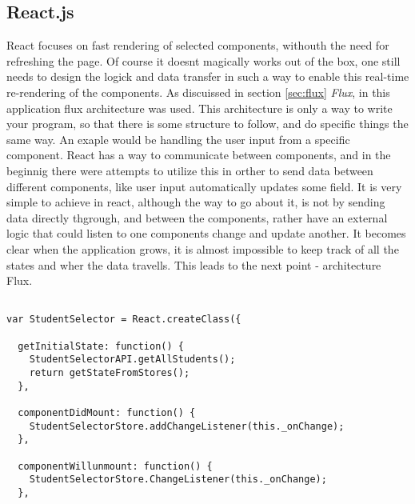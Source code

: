 \subsection{React.js}
React focuses on fast rendering of selected components, withouth the need for refreshing the page. Of course it doesnt magically works out of the box, one still needs to design the logick and data transfer in such a way to enable this real-time re-rendering of the components. As discuissed in section \ref{sec:flux} \emph{Flux}, in this application flux architecture was used. This architecture is only a way to write your program, so that there is some structure to follow, and do specific things the same way. An exaple would be handling the user input from a specific component. React has a way to communicate between components, and in the beginnig there were attempts to utilize this in orther to send data between different components, like user input automatically updates some field. It is very simple to achieve in react, although the way to go about it, is not by sending data directly thgrough, and between the components, rather have an external logic that could listen to one components change and update another. It becomes clear when the application grows, it is almost impossible to keep track of all the states and wher the data travells. This leads to the next point - architecture Flux.


\begin{lstlisting}[caption=React setup for listening to cache/data store, label=lst:componentlisteners]

var StudentSelector = React.createClass({

  getInitialState: function() {
    StudentSelectorAPI.getAllStudents();
    return getStateFromStores();
  },

  componentDidMount: function() {
    StudentSelectorStore.addChangeListener(this._onChange);
  },

  componentWillunmount: function() {
    StudentSelectorStore.ChangeListener(this._onChange);
  },

\end{lstlisting}

